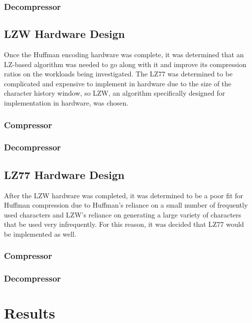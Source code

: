 \documentclass[doublespace,draft,nopageskip]{VTthesis} %
\begin{document}
\subsection{Decompressor}\label{ss:huffman_hardware_decompressor}

\section{LZW Hardware Design}\label{se:lzw_hardware_design}
Once the Huffman encoding hardware was complete, it was determined that an LZ-based algorithm was needed to go along with it and improve its compression ratios on the workloads being investigated. The LZ77 was determined to be complicated and expensive to implement in hardware due to the size of the character history window, so LZW, an algorithm specifically designed for implementation in hardware, was chosen.

\subsection{Compressor}\label{ss:lzw_hardware_compressor}
\subsection{Decompressor}\label{ss:lzw_hardware_decompressor}

\section{LZ77 Hardware Design}\label{se:lz77_hardware_design}
After the LZW hardware was completed, it was determined to be a poor fit for Huffman compression due to Huffman's reliance on a small number of frequently used characters and LZW's reliance on generating a large variety of characters that be used very infrequently. For this reason, it was decided that LZ77 would be implemented as well. 

\subsection{Compressor}\label{ss:lz77_hardware_compressor}
\subsection{Decompressor}\label{ss:lz78_hardware_decompressor}

\chapter{Results} \label{ch:results}
\end{document}
